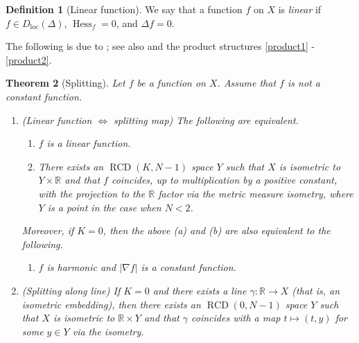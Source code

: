 \documentclass[11pt,reqno]{amsart}
\newtheorem{theorem}{Theorem}[section]
\theoremstyle{definition}
\newtheorem{definition}[theorem]{Definition}
\numberwithin{equation}{section}
\DeclareMathOperator{\Hess}{Hess}
\DeclareMathOperator{\loc}{loc}
\DeclareMathOperator{\RCD}{RCD}
\begin{document}
\begin{definition}[Linear function]\label{lineardef}
    We say that a function $f$ on $X$ is \textit{linear} if $f \in D_{\loc}(\Delta)$, $\Hess_f=0$, and $\Delta f=0$.
\end{definition}
The following is due to \cite{Gsplit}; see also \cite{BPS} and the product structures \eqref{product1} - \eqref{product2}.
\begin{theorem}[Splitting]\label{splitin}
    Let $f$ be a function on $X$. Assume that $f$ is not a constant function.
    \begin{enumerate}
    \item{(Linear function $\Longleftrightarrow$ splitting map)} The following are equivalent.
    \begin{enumerate}
        \item $f$ is a linear function.
        \item There exists an $\RCD(K, N-1)$ space $Y$ such that $X$ is isometric to $Y \times \mathbb{R}$ and that $f$ coincides, up to multiplication by a positive constant, with the projection to the $\mathbb{R}$ factor via the metric measure isometry, where $Y$ is a point in the case when $N<2$.
    \end{enumerate}
    Moreover, if $K=0$, then the above (a) and (b) are also equivalent to the following.
    \begin{enumerate}
        \item[(c)] $f$ is harmonic  and $|\nabla f|$ is a constant function.
    \end{enumerate}
    \item{(Splitting along line)} If $K=0$ and there exists a line $\gamma:\mathbb{R} \to X$ (that is, an isometric embedding), then there exists an $\RCD(0, N-1)$ space $Y$ such that $X$ is isometric to $\mathbb{R} \times Y$ and that $\gamma$ coincides with a map $t \mapsto (t, y)$ for some  $y \in Y$ via the isometry.
    \end{enumerate}
\end{theorem}
\end{document}

